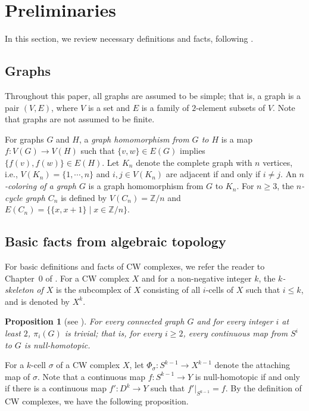 \documentclass[11pt, amsfonts]{amsart}
\numberwithin{equation}{section}
\newtheorem{proposition}[thm]{Proposition}
\theoremstyle{definition}
\theoremstyle{remark}
\newcommand{\ZZ}{\mathbb{Z}}
\begin{document}
\section{Preliminaries} \label{section preliminaries}

In this section, we review necessary definitions and facts, following \cite{GR, Hatcher, HN, Kozlov}.



\subsection{Graphs}

Throughout this paper, all graphs are assumed to be simple; that is, a graph is a pair $(V, E)$, where $V$ is a set and $E$ is a family of $2$-element subsets of $V$. Note that graphs are not assumed to be finite.

For graphs $G$ and $H$, a \emph{graph homomorphism from $G$ to $H$} is a map $f \colon V(G) \to V(H)$ such that $\{ v,w\} \in E(G)$ implies $\{ f(v), f(w)\} \in E(H)$. Let $K_n$ denote the complete graph with $n$ vertices, i.e., $V(K_n) = \{ 1, \cdots, n\}$ and $i,j \in V(K_n)$ are adjacent if and only if $i \ne j$. An \emph{$n$-coloring of a graph $G$} is a graph homomorphism from $G$ to $K_n$. For $n \ge 3$, the \emph{$n$-cycle graph $C_n$} is defined by $V(C_n) = \ZZ / n$ and $E(C_n) = \{ \{ x,x +1 \} \mid x \in \ZZ / n\}$.



\subsection{Basic facts from algebraic topology}

For basic definitions and facts of CW complexes, we refer the reader to Chapter~0 of \cite{Hatcher}. For a CW complex $X$ and for a non-negative integer $k$, the \emph{$k$-skeleton of $X$} is the subcomplex of $X$ consisting of all $i$-cells of $X$ such that $i \le k$, and is denoted by $X^k$.

\begin{proposition}[{see \cite[Example~1B.1 and Proposition 4.1]{Hatcher}}] \label{proposition KG1}
For every connected graph $G$ and for every integer $i$ at least $2$, $\pi_i(G)$ is trivial; that is, for every $i \ge 2$, every continuous map from $S^i$ to $G$ is null-homotopic.
\end{proposition}

For a $k$-cell $\sigma$ of a CW complex $X$, let $\Phi_\sigma \colon S^{k-1} \to X^{k-1}$ denote the attaching map of $\sigma$. Note that a continuous map $f \colon S^{k-1} \to Y$ is null-homotopic if and only if there is a continuous map $f' \colon D^k \to Y$ such that $f'|_{S^{k-1}} = f$. By the definition of CW complexes, we have the following proposition.
\end{document}
